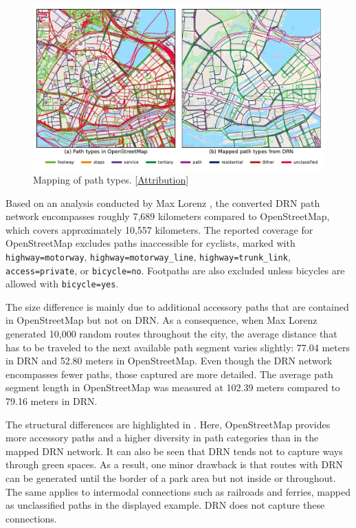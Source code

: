 \begin{figure}[t]
\centering
\includegraphics[width=\linewidth]{images/routing-drn-osm-map.pdf}
\caption{Mapping of path types. [\hyperref[attribution]{Attribution}]}
\label{fig:routing-drn-osm-map}
\end{figure}

Based on an analysis conducted by Max Lorenz \cite{lorenz_2022}, the converted DRN path network encompasses roughly 7,689 kilometers compared to OpenStreetMap, which covers approximately 10,557 kilometers. The reported coverage for OpenStreetMap excludes paths inaccessible for cyclists, marked with \texttt{highway=motorway}, \texttt{highway=motorway\_line}, \texttt{highway=trunk\_link}, \texttt{access=private}, or \texttt{bi\allowbreak cycle=no}. Footpaths are also excluded unless bicycles are allowed with \texttt{bicycle=yes}. 

The size difference is mainly due to additional accessory paths that are contained in OpenStreetMap but not on DRN. As a consequence, when Max Lorenz \cite{lorenz_2022} generated 10,000 random routes throughout the city, the average distance that has to be traveled to the next available path segment varies slightly: 77.04 meters in DRN and 52.80 meters in OpenStreetMap. Even though the DRN network encompasses fewer paths, those captured are more detailed. The average path segment length in OpenStreetMap was measured at 102.39 meters compared to 79.16 meters in DRN.

The structural differences are highlighted in . Here, OpenStreetMap provides more accessory paths and a higher diversity in path categories than in the mapped DRN network. It can also be seen that DRN tends not to capture ways through green spaces. As a result, one minor drawback is that routes with DRN can be generated until the border of a park area but not inside or throughout. The same applies to intermodal connections such as railroads and ferries, mapped as unclassified paths in the displayed example. DRN does not capture these connections.

